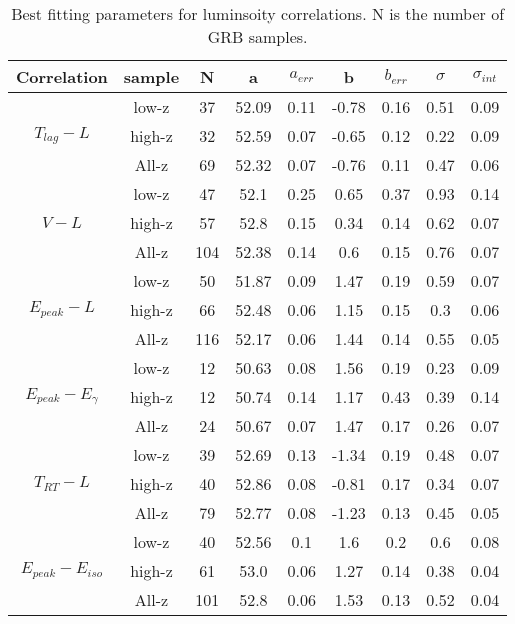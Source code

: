 \begin{table} [H]
\centering
\begin{tabular}{|c|c|c|c|c|c|c|c|c|}
\hline
Correlation & sample & N & a & $a_{err}$ & b & $b_{err}$ & $\sigma$ & $\sigma_{int}$\\
\hline
\multirow{3}{*}{$T_{lag}-L$} & low-z & 37 & 52.09 & 0.11 & -0.78 & 0.16 & 0.51 & 0.09\\
\cline{2-9}
 & high-z & 32 & 52.59 & 0.07 & -0.65 & 0.12 & 0.22 & 0.09\\
\cline{2-9}
 & All-z & 69 & 52.32 & 0.07 & -0.76 & 0.11 & 0.47 & 0.06\\
\hline
\multirow{3}{*}{$V-L$} & low-z & 47 & 52.1 & 0.25 & 0.65 & 0.37 & 0.93 & 0.14\\
\cline{2-9}
 & high-z & 57 & 52.8 & 0.15 & 0.34 & 0.14 & 0.62 & 0.07\\
\cline{2-9}
 & All-z & 104 & 52.38 & 0.14 & 0.6 & 0.15 & 0.76 & 0.07\\
\hline
\multirow{3}{*}{$E_{peak}-L$} & low-z & 50 & 51.87 & 0.09 & 1.47 & 0.19 & 0.59 & 0.07\\
\cline{2-9}
 & high-z & 66 & 52.48 & 0.06 & 1.15 & 0.15 & 0.3 & 0.06\\
\cline{2-9}
 & All-z & 116 & 52.17 & 0.06 & 1.44 & 0.14 & 0.55 & 0.05\\
\hline
\multirow{3}{*}{$E_{peak}-E_{\gamma}$} & low-z & 12 & 50.63 & 0.08 & 1.56 & 0.19 & 0.23 & 0.09\\
\cline{2-9}
 & high-z & 12 & 50.74 & 0.14 & 1.17 & 0.43 & 0.39 & 0.14\\
\cline{2-9}
 & All-z & 24 & 50.67 & 0.07 & 1.47 & 0.17 & 0.26 & 0.07\\
\hline
\multirow{3}{*}{$T_{RT}-L$} & low-z & 39 & 52.69 & 0.13 & -1.34 & 0.19 & 0.48 & 0.07\\
\cline{2-9}
 & high-z & 40 & 52.86 & 0.08 & -0.81 & 0.17 & 0.34 & 0.07\\
\cline{2-9}
 & All-z & 79 & 52.77 & 0.08 & -1.23 & 0.13 & 0.45 & 0.05\\
\hline
\multirow{3}{*}{$E_{peak}-E_{iso}$} & low-z & 40 & 52.56 & 0.1 & 1.6 & 0.2 & 0.6 & 0.08\\
\cline{2-9}
 & high-z & 61 & 53.0 & 0.06 & 1.27 & 0.14 & 0.38 & 0.04\\
\cline{2-9}
 & All-z & 101 & 52.8 & 0.06 & 1.53 & 0.13 & 0.52 & 0.04\\
\hline
\end{tabular}
\caption{Best fitting parameters for luminsoity correlations. N is the number of GRB samples.}
\label{table_pantheon_gp}
\end{table}

